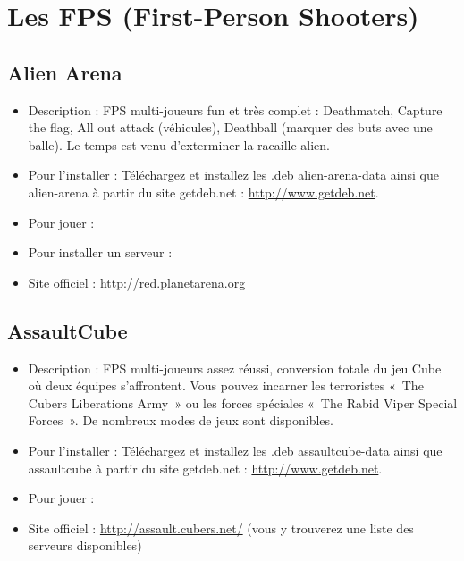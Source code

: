 \section{Les FPS (First-Person Shooters)}
\subsection{Alien Arena}
\begin{itemize}
\begingroup
{}
\item Description : FPS multi-joueurs fun et très complet : Deathmatch, Capture the flag, All out attack (véhicules), Deathball (marquer des buts avec une balle). Le temps est venu d'exterminer la racaille alien.{\par}
\item Pour l'installer : Téléchargez et installez les .deb alien-arena-data ainsi que alien-arena à partir du site getdeb.net :
\url{http://www.getdeb.net}.{\par}
\item Pour jouer : 
\item Pour installer un serveur : 
\item Site officiel : \url{http://red.planetarena.org}{\par}
\endgroup
\end{itemize}
\subsection{AssaultCube}
\begin{itemize}
\begingroup
{}
\item Description : FPS multi-joueurs assez réussi, conversion totale du jeu Cube où deux équipes s'affrontent. Vous pouvez incarner les terroristes «~The Cubers Liberations Army~» ou les forces spéciales «~The Rabid Viper Special Forces~». De nombreux modes de jeux sont disponibles.{\par}
\endgroup
\item Pour l'installer : Téléchargez et installez les .deb assaultcube-data ainsi que assaultcube à partir du site getdeb.net :
\url{http://www.getdeb.net}.{\par}
\item Pour jouer : 
\item Site officiel : \url{http://assault.cubers.net/} (vous y trouverez une liste des serveurs disponibles){\par}
\end{itemize}
